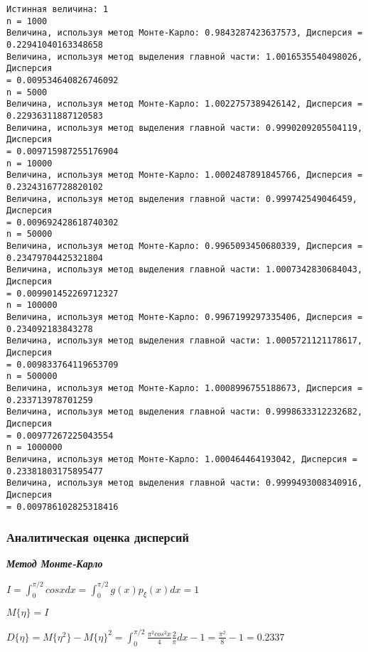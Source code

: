 \documentclass[11pt]{article}
\begin{document}
    \begin{Verbatim}[commandchars=\\\{\}]
Истинная величина: 1
n = 1000
Величина, используя метод Монте-Карло: 0.9843287423637573, Дисперсия =
0.22941040163348658
Величина, используя метод выделения главной части: 1.0016535540498026, Дисперсия
= 0.009534640826746092
n = 5000
Величина, используя метод Монте-Карло: 1.0022757389426142, Дисперсия =
0.22936311887120583
Величина, используя метод выделения главной части: 0.9990209205504119, Дисперсия
= 0.009715987255176904
n = 10000
Величина, используя метод Монте-Карло: 1.0002487891845766, Дисперсия =
0.23243167728820102
Величина, используя метод выделения главной части: 0.999742549046459, Дисперсия
= 0.009692428618740302
n = 50000
Величина, используя метод Монте-Карло: 0.9965093450680339, Дисперсия =
0.23479704425321804
Величина, используя метод выделения главной части: 1.0007342830684043, Дисперсия
= 0.009901452269712327
n = 100000
Величина, используя метод Монте-Карло: 0.9967199297335406, Дисперсия =
0.234092183843278
Величина, используя метод выделения главной части: 1.0005721121178617, Дисперсия
= 0.009833764119653709
n = 500000
Величина, используя метод Монте-Карло: 1.0008996755188673, Дисперсия =
0.233713978701259
Величина, используя метод выделения главной части: 0.9998633312232682, Дисперсия
= 0.00977267225043554
n = 1000000
Величина, используя метод Монте-Карло: 1.000464464193042, Дисперсия =
0.23381803175895477
Величина, используя метод выделения главной части: 0.9999493008340916, Дисперсия
= 0.009786102825318416
    \end{Verbatim}

    \hypertarget{ux430ux43dux430ux43bux438ux442ux438ux447ux435ux441ux43aux430ux44f-ux43eux446ux435ux43dux43aux430-ux434ux438ux441ux43fux435ux440ux441ux438ux439}{%
\subsubsection{Аналитическая оценка
дисперсий}\label{ux430ux43dux430ux43bux438ux442ux438ux447ux435ux441ux43aux430ux44f-ux43eux446ux435ux43dux43aux430-ux434ux438ux441ux43fux435ux440ux441ux438ux439}}

    \textbf{\emph{Метод Монте-Карло}}

\(I = \int_0^{\pi/2}cosxdx = \int_0^{\pi/2}g(x)p_{\xi}(x)dx = 1\)

\(M\{\eta\} = I\)

\(D\{\eta\} = M\{\eta^2\}- M\{\eta\}^2 = \int_0^{\pi/2}\frac{\pi^2cos^2x}{4}\frac{2}{\pi}dx - 1 = \frac{\pi^2}{8} - 1 = 0.2337\)
\end{document}
